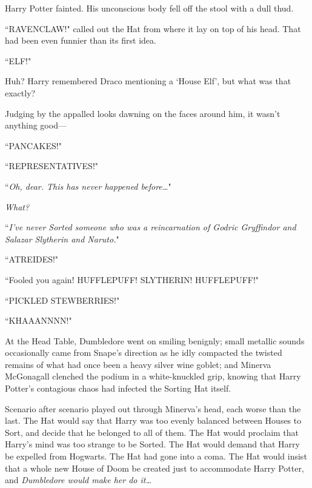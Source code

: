 Harry Potter fainted. His unconscious body fell off the stool with a dull thud.

``RAVENCLAW!" called out the Hat from where it lay on top of his head. That had been even funnier than its first idea.

\later

``ELF!"

Huh? Harry remembered Draco mentioning a `House Elf', but what was that exactly?

Judging by the appalled looks dawning on the faces around him, it wasn't anything good—

\later

``PANCAKES!"

\later

``REPRESENTATIVES!"

\later

``\emph{Oh, dear. This has never happened before{\ldots}}"

\emph{What?}

``\emph{I've never Sorted someone who was a reincarnation of Godric Gryffindor \emph{and} Salazar Slytherin \emph{and} Naruto.}"

\later

``ATREIDES!"

\later

``Fooled you again! HUFFLEPUFF! SLYTHERIN! HUFFLEPUFF!"

\later

``PICKLED STEWBERRIES!"

\later

``KHAAANNNN!"

\later

At the Head Table, Dumbledore went on smiling benignly; small metallic sounds occasionally came from Snape's direction as he idly compacted the twisted remains of what had once been a heavy silver wine goblet; and Minerva McGonagall clenched the podium in a white-knuckled grip, knowing that Harry Potter's contagious chaos had infected the Sorting Hat itself.

Scenario after scenario played out through Minerva's head, each worse than the last. The Hat would say that Harry was too evenly balanced between Houses to Sort, and decide that he belonged to all of them. The Hat would proclaim that Harry's mind was too strange to be Sorted. The Hat would demand that Harry be expelled from Hogwarts. The Hat had gone into a coma. The Hat would insist that a whole new House of Doom be created just to accommodate Harry Potter, and \emph{Dumbledore would make her do it{\ldots}}

